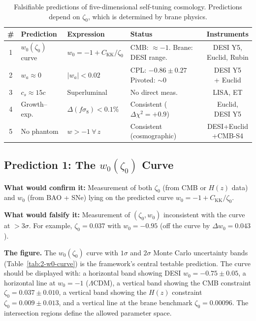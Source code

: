 \begin{table}[htbp]
\centering
\caption{Falsifiable predictions of five-dimensional self-tuning cosmology. Predictions depend on $\zeta_0$, which is determined by brane physics.}
\label{tab:2-predictions}
\small
\begin{tabular}{clllc}
\toprule
\# & Prediction & Expression & Status & Instruments \\
\midrule
1 & $w_0(\zeta_0)$ curve &
  $w_0 = -1 + C_\mathrm{KK}/\zeta_0$ &
  \parbox[t]{2.8cm}{CMB: $\approx -1$.\\Brane: DESI range.} &
  \parbox[t]{2.0cm}{DESI Y5,\\Euclid, Rubin} \\[8pt]
2 & $w_a \approx 0$ & $|w_a| < 0.02$ &
  \parbox[t]{2.8cm}{CPL: $-0.86 \pm 0.27$\\Pivoted: $\sim 0$} &
  \parbox[t]{2.0cm}{DESI Y5\\+ Euclid} \\[6pt]
3 & $c_s \approx 15c$ & Superluminal &
  No direct meas.\ &
  \parbox[t]{2.0cm}{LISA, ET} \\[6pt]
4 & Growth--exp.\ & $\Delta(f\sigma_8) < 0.1\%$ &
  \parbox[t]{2.8cm}{Consistent\\($\Delta\chi^2 = +0.9$)} &
  \parbox[t]{2.0cm}{Euclid,\\DESI Y5} \\[6pt]
5 & No phantom & $w > -1\ \forall\, z$ &
  \parbox[t]{2.8cm}{Consistent\\(cosmographic)} &
  \parbox[t]{2.0cm}{DESI+Euclid\\+CMB-S4} \\
\bottomrule
\end{tabular}
\end{table}

\subsection{Prediction 1: The $w_0(\zeta_0)$ Curve}
\label{sec:2-pred1}

\textbf{What would confirm it:} Measurement of both $\zeta_0$ (from CMB or $H(z)$ data) and $w_0$ (from BAO + SNe) lying on the predicted curve $w_0 = -1 + C_\mathrm{KK}/\zeta_0$.

\textbf{What would falsify it:} Measurement of $(\zeta_0, w_0)$ inconsistent with the curve at $> 3\sigma$. For example, $\zeta_0 = 0.037$ with $w_0 = -0.95$ (off the curve by $\Delta w_0 = 0.043$).

\textbf{The figure.} The $w_0(\zeta_0)$ curve with $1\sigma$ and $2\sigma$ Monte Carlo uncertainty bands (Table~\ref{tab:2-w0-curve}) is the framework's central testable prediction. The curve should be displayed with: a horizontal band showing DESI $w_0 = -0.75 \pm 0.05$, a horizontal line at $w_0 = -1$ ($\Lambda$CDM), a vertical band showing the CMB constraint $\zeta_0 = 0.037 \pm 0.010$, a vertical band showing the $H(z)$ constraint $\zeta_0 = 0.009 \pm 0.013$, and a vertical line at the brane benchmark $\zeta_0 = 0.00096$. The intersection regions define the allowed parameter space.

